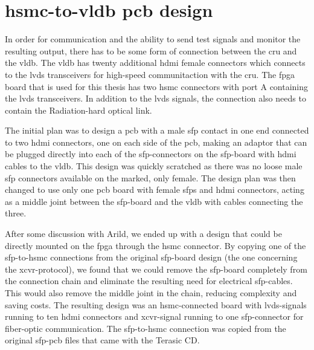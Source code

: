 \documentclass[main.tex]{subfiles}
\begin{document}
\chapter{\acrshort{hsmc}-to-\acrshort{vldb} \acrshort{pcb} design}

In order for communication and the ability to send test signals and monitor the resulting output, there has to be some form of connection between the \gls{cru} and the \gls{vldb}. The \gls{vldb} has twenty additional \acrshort{hdmi} female connectors which connects to the \gls{lvds} transceivers for high-speed communitaction with the \gls{cru}. The \gls{fpga} board that is used for this thesis has two \gls{hsmc} connectors with port A containing the \gls{lvds} transceivers. In addition to the \gls{lvds} signals, the connection also needs to contain the Radiation-hard optical link.

The initial plan was to design a \gls{pcb} with a male \gls{sfp} contact in one end connected to two \gls{hdmi} connectors, one on each side of the \gls{pcb}, making an adaptor that can be plugged directly into each of the \gls{sfp}-connectors on the \gls{sfp}-board with \gls{hdmi} cables to the \gls{vldb}. This design was quickly scratched as there was no loose male \gls{sfp} connectors available on the marked, only female. The design plan was then changed to use only one \gls{pcb} board with female \glspl{sfp} and \gls{hdmi} connectors, acting as a middle joint between the \gls{sfp}-board and the \gls{vldb} with cables connecting the three. 

After some discussion with Arild, we ended up with a design that could be directly mounted on the \gls{fpga} through the \gls{hsmc} connector. By copying one of the \gls{sfp}-to-\gls{hsmc} connections from the original \gls{sfp}-board design (the one concerning the \gls{xcvr}-protocol), we found that we could remove the \gls{sfp}-board completely from the connection chain and eliminate the resulting need for electrical \gls{sfp}-cables. This would also remove the middle joint in the chain, reducing complexity and saving costs. The resulting design was an \gls{hsmc}-connected board with \gls{lvds}-signals running to ten \gls{hdmi} connectors and \gls{xcvr}-signal running to one \gls{sfp}-connector for fiber-optic communication. The \gls{sfp}-to-\gls{hsmc} connection was copied from the original \gls{sfp}-\gls{pcb} files that came with the Terasic CD.
\end{document}
